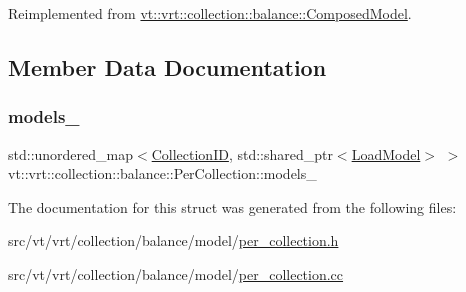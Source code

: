 Reimplemented from \hyperlink{classvt_1_1vrt_1_1collection_1_1balance_1_1_composed_model_ad8108b4392d63b7f09e443920a64933a}{vt\+::vrt\+::collection\+::balance\+::\+Composed\+Model}.



\subsection{Member Data Documentation}
\mbox{\label{structvt_1_1vrt_1_1collection_1_1balance_1_1_per_collection_aec76660b4a44fe451a9546b4f4c50d3d}} 
\subsubsection{\texorpdfstring{models\+\_\+}{models\_}}
{\footnotesize\ttfamily std\+::unordered\+\_\+map$<$\hyperlink{structvt_1_1vrt_1_1collection_1_1balance_1_1_per_collection_ade08a6857f727a0a9d1ef63b25fc5b71}{Collection\+ID}, std\+::shared\+\_\+ptr$<$\hyperlink{classvt_1_1vrt_1_1collection_1_1balance_1_1_load_model}{Load\+Model}$>$ $>$ vt\+::vrt\+::collection\+::balance\+::\+Per\+Collection\+::models\+\_\+\hspace{0.3cm}{\ttfamily [private]}}



The documentation for this struct was generated from the following files\+:\begin{DoxyCompactItemize}
\item 
src/vt/vrt/collection/balance/model/\hyperlink{per__collection_8h}{per\+\_\+collection.\+h}\item 
src/vt/vrt/collection/balance/model/\hyperlink{per__collection_8cc}{per\+\_\+collection.\+cc}\end{DoxyCompactItemize}
